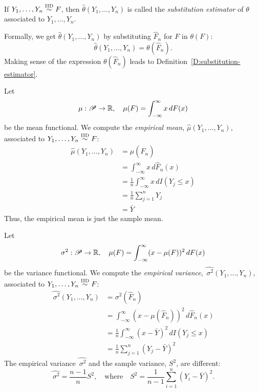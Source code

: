 \documentclass[12pt]{amsart}
\begin{document}
\begin{definition}\label{D:substitution-estimator}
If $Y_1,\ldots,Y_n \overset{\text{\textsc{IID}}}\sim F$, then $\hat\theta(Y_1,\ldots,Y_n)$
is called the \emph{substitution estimator} of $\theta$ associated to $Y_1,\ldots,Y_n$.
\end{definition}
Formally, we get $\hat\theta(Y_1,\ldots,Y_n)$ by substituting $\hat F_n$ for $F$ in $\theta(F)$:
\begin{equation*}%
    \hat\theta(Y_1,\ldots,Y_n) = \theta(\hat F_n).
\end{equation*}
Making sense of the expression $\theta(\hat F_n)$ leads to Definition~\ref{D:substitution-estimator}.

Let
\[
\mu:\mathscr{P}\to\mathbb{R},\quad \mu(F) = \int_{-\infty}^\infty x\,dF(x)
\]
be the mean functional. We compute the \emph{empirical mean}, $\hat\mu(Y_1,\ldots,Y_n)$,
associated to $Y_1,\ldots,Y_n\overset{\text{\textsc{IID}}}\sim F$:
\begin{align*}
    \hat\mu(Y_1,\ldots,Y_n) &= \mu(\hat F_n)\\
    &= \int_{-\infty}^\infty x\,d\hat F_n(x)\\
    &=\frac 1n\int_{-\infty}^\infty x\,dI(Y_j\leq x)\\
    &= \frac 1n \sum_{j=1}^n Y_j\\
    &= \bar Y
\end{align*}
Thus, the empirical mean is just the sample mean.

Let
\[
\sigma^2:\mathscr{P}\to\mathbb{R},\quad \mu(F) = \int_{-\infty}^\infty (x-\mu(F))^2\,dF(x)
\]
be the variance functional. We compute the \emph{empirical variance},
$\hat{\,\sigma^2}(Y_1, \ldots,Y_n)$, associated to $Y_1,\ldots,Y_n\overset{\text{\textsc{IID}}}\sim F$:
\begin{align*}
    \hat{\,\sigma^2}(Y_1,\ldots,Y_n) &= \sigma^2(\hat F_n)\\
    &= \int_{-\infty}^\infty (x - \mu(\hat F_n))^2\,d\hat F_n(x)\\
    &=\frac 1n\int_{-\infty}^\infty (x - \bar{Y})^2\,dI(Y_j\leq x)\\
    &= \frac 1n \sum_{j=1}^n (Y_j-\bar Y)^2
\end{align*}
The empirical variance $\hat{\,\sigma^2}$ and the sample variance, $S^2$, are different:
\[
    \hat{\,\sigma^2}=\frac {n-1}n S^2,\quad\text{where}\quad
    S^2 = \frac1{n-1}\sum_{i=1}^{n}(Y_i-\bar Y)^2.
\]
\end{document}
